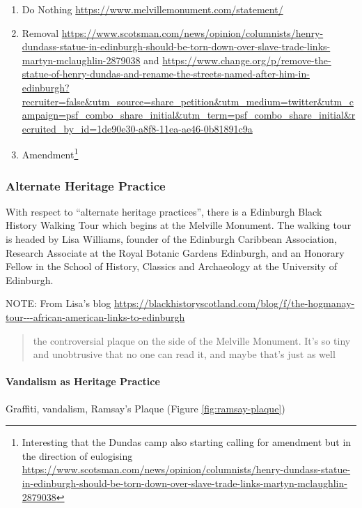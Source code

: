 \documentclass{scrartcl}
\begin{document}
\begin{enumerate}
    \item Do Nothing \url{https://www.melvillemonument.com/statement/}
    \item Removal \url{https://www.scotsman.com/news/opinion/columnists/henry-dundass-statue-in-edinburgh-should-be-torn-down-over-slave-trade-links-martyn-mclaughlin-2879038} and \url{https://www.change.org/p/remove-the-statue-of-henry-dundas-and-rename-the-streets-named-after-him-in-edinburgh?recruiter=false&utm_source=share_petition&utm_medium=twitter&utm_campaign=psf_combo_share_initial&utm_term=psf_combo_share_initial&recruited_by_id=1de90e30-a8f8-11ea-ae46-0b81891c9a}
    \item Amendment\footnote{Interesting that the Dundas camp also starting calling for amendment but in the direction of eulogising \url{https://www.scotsman.com/news/opinion/columnists/henry-dundass-statue-in-edinburgh-should-be-torn-down-over-slave-trade-links-martyn-mclaughlin-2879038}} \cite{esclr_2022}
\end{enumerate}

\subsubsection{Alternate Heritage Practice}

With respect to ``alternate heritage practices'', there is a Edinburgh Black History Walking Tour which begins at the Melville Monument.
The walking tour is headed by Lisa Williams, founder of the Edinburgh Caribbean Association, Research Associate at the Royal Botanic Gardens Edinburgh, and an Honorary Fellow in the School of History, Classics and Archaeology at the University of Edinburgh. 

NOTE: From Lisa's blog \url{https://blackhistoryscotland.com/blog/f/the-hogmanay-tour---african-american-links-to-edinburgh}

\begin{quotation}
    the controversial plaque on the side of the Melville Monument. It's so tiny and unobtrusive that no one can read it, and maybe that's just as well
\end{quotation}


\paragraph{Vandalism as Heritage Practice}

Graffiti, vandalism, Ramsay's Plaque (Figure \ref{fig:ramsay-plaque})
\end{document}
